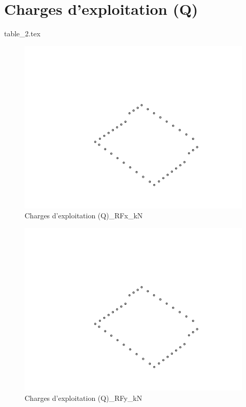 
    \section{Charges d'exploitation (Q)}
    {table_2.tex}

    \begin{figure}[H] %
        \centering %
        \includegraphics[width=\textwidth]{assets/img/graph3D_charges_cas_2_RFx_kN.png} %
        \caption{Charges d'exploitation (Q)\_RFx\_kN} %
    \end{figure}

    \begin{figure}[H] %
        \centering %
        \includegraphics[width=\textwidth]{assets/img/graph3D_charges_cas_2_RFy_kN.png} %
        \caption{Charges d'exploitation (Q)\_RFy\_kN} %
    \end{figure}

